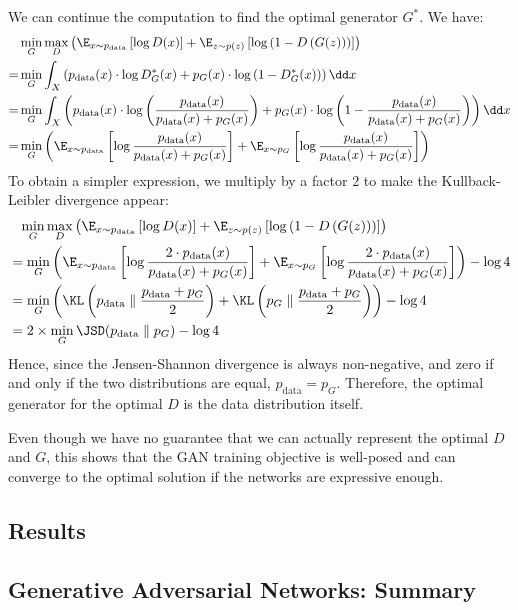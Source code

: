 We can continue the computation to find the optimal generator $G^*$. We have:
\begin{align*}
    &\min_G\max_D \left(
        \E_{x\sim p_{\text{data}}}\left[\log D(x)\right] + \E_{z\sim p(z)}\left[\log\left(1-D\left(G(z)\right)\right)\right]
    \right) \\
    = &\min_G
        \int_X \left( p_{\text{data}}(x)\cdot\log D^*_G(x) + p_G(x)\cdot\log\left(1-D^*_G(x)\right) \right) \dd x \\
    = &\min_G
        \int_X \left( p_{\text{data}}(x)\cdot\log\left(\frac{p_{\text{data}}(x)}{p_{\text{data}}(x) + p_G(x)}\right) + p_G(x)\cdot\log\left(1-\frac{p_{\text{data}}(x)}{p_{\text{data}}(x) + p_G(x)}\right) \right) \dd x \\
    = &\min_G
        \left( \E_{x\sim p_{\text{data}}}\left[\log\frac{p_{\text{data}}(x)}{p_{\text{data}}(x) + p_G(x)}\right] + \E_{x\sim p_G}\left[\log \frac{p_{\text{data}}(x)}{p_{\text{data}}(x) + p_G(x)}\right] \right) \\
\end{align*}
To obtain a simpler expression, we multiply by a factor $2$ to make the Kullback-Leibler divergence appear:
\begin{align*}
    &\phantom{=}\min_G\max_D \left(
        \E_{x\sim p_{\text{data}}}\left[\log D(x)\right] + \E_{z\sim p(z)}\left[\log\left(1-D\left(G(z)\right)\right)\right]
    \right) \\
    &=\min_G
        \left( \E_{x\sim p_{\text{data}}}\left[\log\frac{2\cdot p_{\text{data}}(x)}{p_{\text{data}}(x) + p_G(x)}\right] + \E_{x\sim p_G}\left[\log \frac{2\cdot p_{\text{data}}(x)}{p_{\text{data}}(x) + p_G(x)}\right]\right) - \log4 \\
    &= \min_G
        \left(\KL\left(
            p_{\text{data}}\parallel\frac{p_{\text{data}}+p_G}{2}
        \right) + \KL\left(
            p_G\parallel\frac{p_{\text{data}}+p_G}{2}
        \right)\right) - \log4 \\
    &= 2\times\min_G \JSD(p_{\text{data}}\parallel p_G) - \log4 \\
\end{align*}
Hence, since the Jensen-Shannon divergence is always non-negative, and zero if and only if the two distributions are equal, $p_{\text{data}} = p_G$. Therefore, the optimal generator for the optimal $D$ is the data distribution itself.

Even though we have no guarantee that we can actually represent the optimal $D$ and $G$, this shows that the GAN training objective is well-posed and can converge to the optimal solution if the networks are expressive enough.

\subsection{Results}

\subsection*{Generative Adversarial Networks: Summary}

\newpage